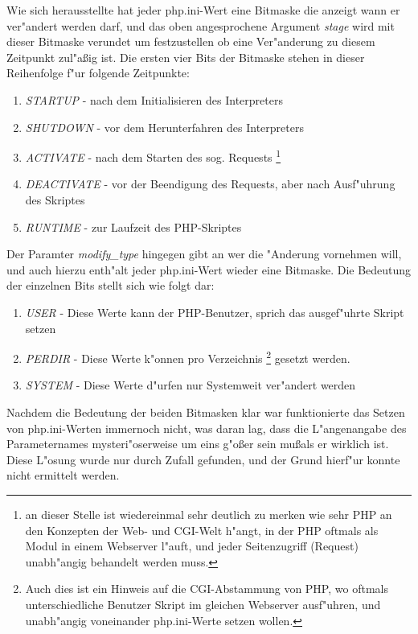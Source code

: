 Wie sich herausstellte hat jeder php.ini-Wert eine Bitmaske die anzeigt wann er ver"andert werden darf, und das oben angesprochene Argument
\emph{stage} wird mit dieser Bitmaske verundet um festzustellen ob eine Ver"anderung zu diesem Zeitpunkt zul"a\ss ig ist.
Die ersten vier Bits der Bitmaske stehen in dieser Reihenfolge f"ur folgende Zeitpunkte: 
\begin{enumerate}
\item \emph{STARTUP} - nach dem Initialisieren des Interpreters
\item \emph{SHUTDOWN} - vor dem Herunterfahren des Interpreters
\item \emph{ACTIVATE} - nach dem Starten des sog. Requests 
      \footnote{an dieser Stelle ist wiedereinmal sehr deutlich zu merken wie sehr PHP an den Konzepten der Web- und CGI-Welt h"angt, in der
      PHP oftmals als Modul in einem Webserver l"auft, und jeder Seitenzugriff (Request) unabh"angig behandelt werden muss.}
\item \emph{DEACTIVATE} - vor der Beendigung des Requests, aber nach Ausf"uhrung des Skriptes
\item \emph{RUNTIME} - zur Laufzeit des PHP-Skriptes
\end{enumerate}
Der Paramter \emph{modify\_type} hingegen gibt an wer die "Anderung vornehmen will, und auch hierzu enth"alt jeder php.ini-Wert wieder eine Bitmaske.
Die Bedeutung der einzelnen Bits stellt sich wie folgt dar:
\begin{enumerate}
\item \emph{USER} - Diese Werte kann der PHP-Benutzer, sprich das ausgef"uhrte Skript setzen
\item \emph{PERDIR} - Diese Werte k"onnen pro Verzeichnis  
      \footnote{Auch dies ist ein Hinweis auf die CGI-Abstammung von PHP, wo oftmals unterschiedliche Benutzer Skript im gleichen Webserver ausf"uhren,
      und unabh"angig voneinander php.ini-Werte setzen wollen.}
      gesetzt werden.
\item \emph{SYSTEM} - Diese Werte d"urfen nur Systemweit ver"andert werden
\end{enumerate}
Nachdem die Bedeutung der beiden Bitmasken klar war funktionierte das Setzen von php.ini-Werten immernoch nicht, was daran lag, dass die L"angenangabe
des Parameternames mysteri"oserweise um eins g"o\ss er sein mu\ss  als er wirklich ist. Diese L"osung wurde nur durch Zufall gefunden, und der
Grund hierf"ur konnte nicht ermittelt werden.

